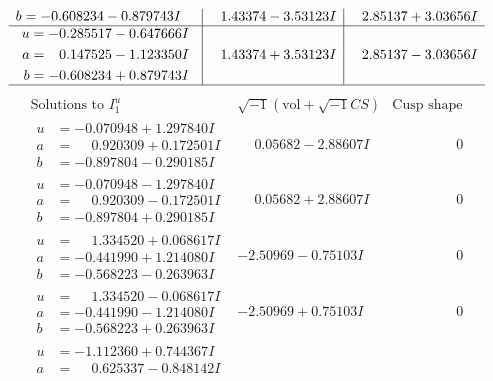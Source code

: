 \documentclass[1p]{elsarticle_modified}
\theoremstyle{definition}
\newcommand{\I}{\sqrt{-1}}
\begin{document}
$$\begin{array}{c|c|c}
\begin{aligned}
b &= -0.608234 - 0.879743 I\end{aligned}
 & \phantom{-}1.43374 - 3.53123 I & \phantom{-}2.85137 + 3.03656 I \\ \hline\begin{aligned}
u &= -0.285517 - 0.647666 I \\
a &= \phantom{-}0.147525 - 1.123350 I \\
b &= -0.608234 + 0.879743 I\end{aligned}
 & \phantom{-}1.43374 + 3.53123 I & \phantom{-}2.85137 - 3.03656 I\\
 \hline 
 \end{array}$$\newpage$$\begin{array}{c|c|c}  
\text{Solutions to }I^u_{1}& \I (\text{vol} + \sqrt{-1}CS) & \text{Cusp shape}\\
 \hline 
\begin{aligned}
u &= -0.070948 + 1.297840 I \\
a &= \phantom{-}0.920309 + 0.172501 I \\
b &= -0.897804 - 0.290185 I\end{aligned}
 & \phantom{-}0.05682 - 2.88607 I & \phantom{-0.000000 } 0 \\ \hline\begin{aligned}
u &= -0.070948 - 1.297840 I \\
a &= \phantom{-}0.920309 - 0.172501 I \\
b &= -0.897804 + 0.290185 I\end{aligned}
 & \phantom{-}0.05682 + 2.88607 I & \phantom{-0.000000 } 0 \\ \hline\begin{aligned}
u &= \phantom{-}1.334520 + 0.068617 I \\
a &= -0.441990 + 1.214080 I \\
b &= -0.568223 - 0.263963 I\end{aligned}
 & -2.50969 - 0.75103 I & \phantom{-0.000000 } 0 \\ \hline\begin{aligned}
u &= \phantom{-}1.334520 - 0.068617 I \\
a &= -0.441990 - 1.214080 I \\
b &= -0.568223 + 0.263963 I\end{aligned}
 & -2.50969 + 0.75103 I & \phantom{-0.000000 } 0 \\ \hline\begin{aligned}
u &= -1.112360 + 0.744367 I \\
a &= \phantom{-}0.625337 - 0.848142 I \\

\end{aligned}
\end{array}$$
\end{document}
